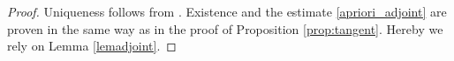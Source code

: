 \begin{proof}
Uniqueness follows from \cite[Proposition 15]{coron2003exact}. Existence and the estimate \eqref{apriori_adjoint} are proven in the same way as in the proof of Proposition \ref{prop:tangent}. Hereby we rely on Lemma \ref{lemadjoint}.
\qquad\end{proof}







